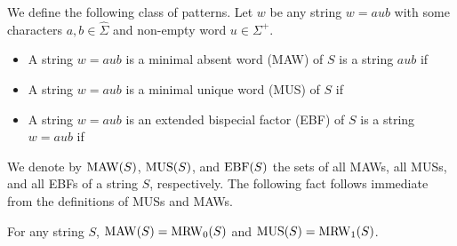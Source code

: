\begin{definition}
  We define the following class of patterns.
  Let $w$ be any string $w = a u b$ with some characters $a, b\in \hat\Sigma$ and non-empty word $u \in \Sigma^+$. 
  \begin{itemize}
  \item A string $w = a u b$ is a minimal absent word (MAW) of $S$ is a string $a u b$ if 

  \item A string $w = a u b$ is a minimal unique word (MUS) of $S$ if 

  \item A string $w = a u b$ is an extended bispecial factor (EBF) of $S$ is a string $w = a u b$ if 

\end{itemize}
\end{definition}

We denote by $\mathrm{MAW}(S)$, $\mathrm{MUS}(S)$, and $\mathrm{EBF}(S)$ the sets of all MAWs, all MUSs, and all EBFs of a string $S$, respectively.
The following fact follows immediate from the definitions of MUSs and MAWs.

\begin{lemma}
  \label{lem:char:maw:mus}
  For any string $S$,
  $\mathrm{MAW}(S) = \mathrm{MRW}_0(S)$ and 
  $\mathrm{MUS}(S) = \mathrm{MRW}_1(S)$. 
\end{lemma}

